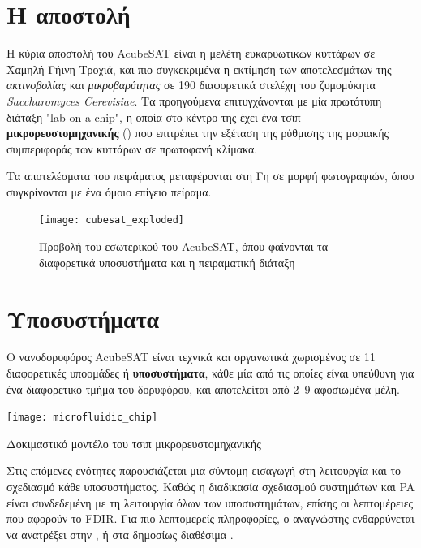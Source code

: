 \documentclass[a4paper,nobib]{tufte-book}
\begin{document}
\section{Η αποστολή}


Η κύρια αποστολή του AcubeSAT είναι η μελέτη ευκαρυωτικών κυττάρων σε Χαμηλή Γήινη Τροχιά, και πιο συγκεκριμένα η εκτίμηση των αποτελεσμάτων της \emph{ακτινοβολίας} και \emph{μικροβαρύτητας} σε 190 διαφορετικά στελέχη του ζυμομύκητα \emph{Saccharomyces Cerevisiae}. Τα προηγούμενα επιτυγχάνονται με μία πρωτότυπη διάταξη "lab-on-a-chip", η οποία στο κέντρο της έχει ένα τσιπ \textbf{μικρορευστομηχανικής} () \parencite{volpetti_microfluidic_biodisplay_2017} που επιτρέπει την εξέταση της ρύθμισης της μοριακής συμπεριφοράς των κυττάρων σε πρωτοφανή κλίμακα.

Τα αποτελέσματα του πειράματος μεταφέρονται στη Γη σε μορφή φωτογραφιών, όπου συγκρίνονται με ένα όμοιο επίγειο πείραμα.



\begin{figure}[th]
	\centering
	\texttt{[image: cubesat\_exploded]}
	\caption{Προβολή του εσωτερικού του AcubeSAT, όπου φαίνονται τα διαφορετικά υποσυστήματα και η πειραματική διάταξη}
\end{figure}

\section{Υποσυστήματα}

Ο νανοδορυφόρος AcubeSAT είναι τεχνικά και οργανωτικά χωρισμένος σε 11 διαφορετικές υποομάδες ή \textbf{υποσυστήματα}, κάθε μία από τις οποίες είναι υπεύθυνη για ένα διαφορετικό τμήμα του δορυφόρου, και αποτελείται από \SIrange{2}{9}{} αφοσιωμένα μέλη.
\begin{marginfigure}
	\texttt{[image: microfluidic\_chip]}
	\caption{Δοκιμαστικό μοντέλο του τσιπ μικρορευστομηχανικής}
	\label{fig:microfluidic_chip}
\end{marginfigure}

Στις επόμενες ενότητες παρουσιάζεται μια σύντομη εισαγωγή στη λειτουργία και το σχεδιασμό κάθε υποσυστήματος. Καθώς η διαδικασία σχεδιασμού συστημάτων και \acl{PA} είναι %
συνδεδεμένη με τη λειτουργία όλων των υποσυστημάτων,  επίσης οι λεπτομέρειες που αφορούν το \acs{FDIR}. Για πιο λεπτομερείς πληροφορίες, ο αναγνώστης ενθαρρύνεται να ανατρέξει στην , ή στα δημοσίως διαθέσιμα .
\end{document}
